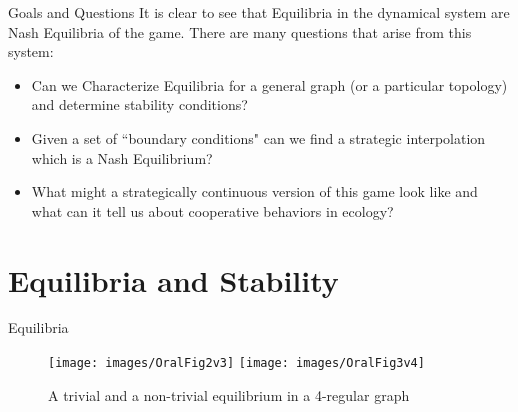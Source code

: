 \documentclass{beamer}
\begin{document}
\begin{frame}{Goals and Questions}
	It is clear to see that Equilibria in the dynamical system are Nash Equilibria of the game. There are many questions that arise from this system:
	\begin{itemize}
		\item Can we Characterize Equilibria for a general graph (or a particular topology) and determine stability conditions?
		
		\item Given a set of ``boundary conditions" can we find a strategic interpolation which is a Nash Equilibrium?
		
		\item What might a strategically continuous version of this game look like and what can it tell us about cooperative behaviors in ecology?
	\end{itemize}
\end{frame}
\section{Equilibria and Stability}
\begin{frame}{Equilibria}
	\begin{figure}
		\texttt{[image: images/OralFig2v3]}
		\texttt{[image: images/OralFig3v4]}
		\caption{A trivial and a non-trivial equilibrium in a 4-regular graph}
	\end{figure}
\end{frame}
\end{document}
